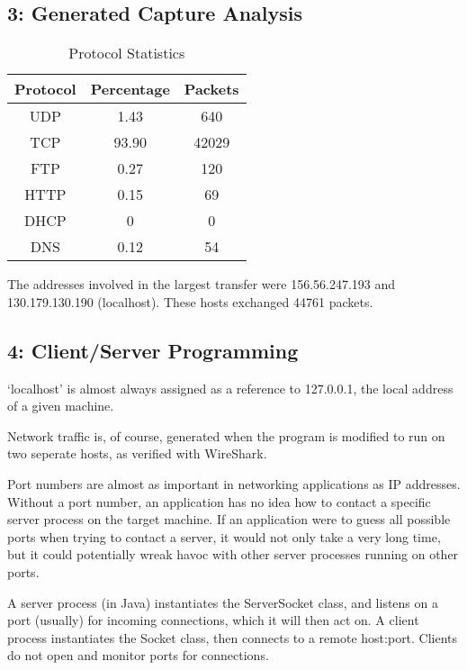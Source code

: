 \documentclass[10pt,letterpaper,titlepage]{article}
\begin{document}
\newpage
\subsection*{3: Generated Capture Analysis}
\begin{table}[ht]
\caption{Protocol Statistics}
\centering
\begin{tabular}{c c c}
\hline\hline
Protocol & Percentage & Packets \\
\hline
UDP      & 1.43       & 640     \\ 
TCP      & 93.90      & 42029   \\ 
FTP      & 0.27       & 120     \\ 
HTTP     & 0.15       & 69      \\ 
DHCP     & 0          & 0       \\ 
DNS      & 0.12       & 54      \\ 
\hline
\end{tabular}
\end{table}

The addresses involved in the largest transfer were 156.56.247.193 and \\ 130.179.130.190 (localhost). These hosts exchanged 44761 packets.

\subsection*{4: Client/Server Programming}

`localhost' is almost always assigned as a reference to 127.0.0.1, the local address of a given machine.

Network traffic is, of course, generated when the program is modified to run on two seperate hosts, as verified with WireShark.

Port numbers are almost as important in networking applications as IP addresses. Without a port number, an application has no idea how to contact a specific server process on the target machine. If an application were to guess all possible ports when trying to contact a server, it would not only take a very long time, but it could potentially wreak havoc with other server processes running on other ports.

A server process (in Java) instantiates the ServerSocket class, and listens on a port (usually) for incoming connections, which it will then act on. A client process instantiates the Socket class, then connects to a remote host:port. Clients do not open and monitor ports for connections.
\end{document}
